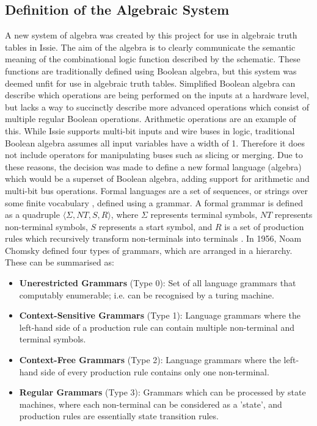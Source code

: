 \subsection{Definition of the Algebraic System} \label{subsec:algebradef}
A new system of algebra was created by this project for use in algebraic truth tables in Issie. The aim of the algebra is to clearly communicate the semantic meaning of the combinational logic function described by the schematic. These functions are traditionally defined using Boolean algebra, but this system was deemed unfit for use in algebraic truth tables. Simplified Boolean algebra can describe which operations are being performed on the inputs at a hardware level, but lacks a way to succinctly describe more advanced operations which consist of multiple regular Boolean operations. Arithmetic operations are an example of this. While Issie supports multi-bit inputs and wire buses in logic, traditional Boolean algebra assumes all input variables have a width of 1. Therefore it does not include operators for manipulating buses such as slicing or merging. Due to these reasons, the decision was made to define a new formal language (algebra) which would be a superset of Boolean algebra, adding support for arithmetic and multi-bit bus operations. Formal languages are a set of sequences, or strings over some finite vocabulary , defined using a grammar. A formal grammar is defined as a quadruple $\langle \Sigma,NT,S,R \rangle$, where $\Sigma$ represents terminal symbols, $NT$ represents non-terminal symbols, $S$ represents a start symbol, and $R$ is a set of production rules which recursively transform non-terminals into terminals \cite{jäger_rogers_2012}. In 1956, Noam Chomsky \cite{chomsky} defined four types of grammars, which are arranged in a hierarchy. These can be summarised as:
\begin{itemize}
    \item[] \textbf{Unerestricted Grammars} (Type 0): Set of all language grammars that computably enumerable; i.e. can be recognised by a turing machine. 
    \item[] \textbf{Context-Sensitive Grammars} (Type 1): Language grammars where the left-hand side of a production rule can contain multiple non-terminal and terminal symbols.
     \item[] \textbf{Context-Free Grammars} (Type 2): Language grammars where the left-hand side of every production rule contains only one non-terminal.
     \item[] \textbf{Regular Grammars} (Type 3): Grammars which can be processed by state machines, where each non-terminal can be considered as a 'state', and production rules are essentially state transition rules.
\end{itemize}

